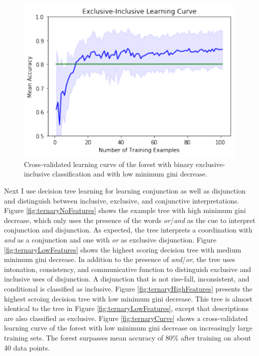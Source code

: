 \documentclass[oneside]{report}
\theoremstyle{definition}
\theoremstyle{definition}
\theoremstyle{definition}
\theoremstyle{remark}
\begin{document}
\begin{figure}
\centering
\includegraphics{figs/binaryLearningCurve-1.pdf}
\caption{\label{fig:binaryLearningCurve}Cross-validated learning curve of
the forest with binary exclusive-inclusive classification and with low
minimum gini decrease.}
\end{figure}
Next I use decision tree learning for learning conjunction as well as
disjunction and distinguish between inclusive, exclusive, and
conjunctive interpretations. Figure \ref{fig:ternaryNoFeatures} shows
the example tree with high minimum gini decrease, which only uses the
presence of the words \emph{or}/\emph{and} as the cue to interpret
conjunction and disjunction. As expected, the tree interprets a
coordination with \emph{and} as a conjunction and one with \emph{or} as
exclusive disjunction. Figure \ref{fig:ternaryLowFeatures} shows the
highest scoring decision tree with medium minimum gini decrease. In
addition to the presence of \emph{and}/\emph{or}, the tree uses
intonation, consistency, and communicative function to distinguish
exclusive and inclusive uses of disjunction. A disjunction that is not
rise-fall, inconsistent, and conditional is classified as inclusive.
Figure \ref{fig:ternaryHighFeatures} presents the highest scroing
decision tree with low minimum gini decrease. This tree is almost
identical to the tree in Figure \ref{fig:ternaryLowFeatures}, except
that descriptions are also classified as exclusive. Figure
\ref{fig:ternaryCurve} shows a cross-validated learning curve of the
forest with low minimum gini decrease on increasingly large training
sets. The forest surpasses mean accuracy of 80\% after training on about
40 data points.
\end{document}
